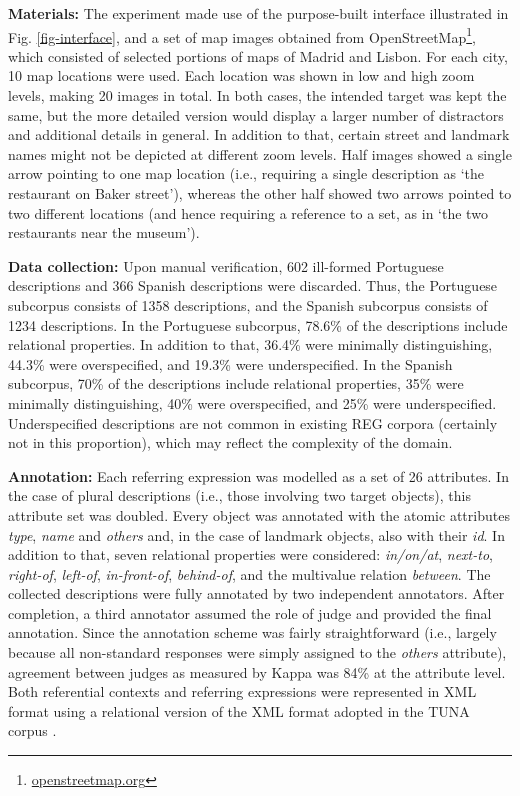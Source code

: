 \documentclass[11pt]{article}
\begin{document}
{\bf Materials:} The experiment made use of the purpose-built interface illustrated in Fig. \ref{fig-interface}, and a set of map images obtained from OpenStreetMap\footnote{\url{openstreetmap.org}}, which consisted of selected portions of maps of Madrid and Lisbon. For each city, 10 map locations were used. Each location was shown in low and high zoom levels, making 20 images in total. In both cases, the intended target was kept the same, but the more detailed version would display a larger number of distractors and additional details in general. In addition to that, certain street and landmark names might not be depicted at different zoom levels. Half images showed a single arrow pointing to one map location (i.e., requiring a single description as `the restaurant on Baker street'), whereas the other half showed two arrows pointed to two different locations (and hence requiring a reference to a set, as in `the two restaurants near the museum'). 

{\bf Data collection:} Upon manual verification, 602 ill-formed Portuguese descriptions and 366 Spanish descriptions were discarded. Thus, the Portuguese subcorpus consists of 1358 descriptions, and the Spanish subcorpus consists of 1234 descriptions. In the Portuguese subcorpus, 78.6\% of the descriptions include relational properties. In addition to that, 36.4\% were minimally distinguishing, 44.3\% were overspecified, and  19.3\% were underspecified. In the Spanish subcorpus, 70\% of the descriptions include relational properties, 35\% were minimally distinguishing, 40\% were overspecified, and 25\% were underspecified. Underspecified descriptions are not common in existing REG corpora (certainly not in this proportion), which may reflect the complexity of the domain.

{\bf Annotation:} Each referring expression was modelled as a set of 26 attributes. In the case of plural descriptions (i.e., those involving two target objects), this attribute set was doubled. Every object was annotated with the atomic attributes {\em type}, {\em name} and {\em others} and, in the case of landmark objects, also with their {\em id}. In addition to that, seven relational properties were considered: {\em in/on/at}, {\em next-to}, {\em right-of}, {\em left-of}, {\em in-front-of}, {\em behind-of}, and the multivalue relation {\em between}. The collected descriptions were fully annotated by two independent annotators. After completion, a third annotator assumed the role of judge and provided the final annotation. Since the annotation scheme was fairly straightforward (i.e., largely because all non-standard responses were simply assigned to the {\em others} attribute), agreement between judges as measured by Kappa \cite{kappa} was 84\% at the attribute level. Both referential contexts and referring expressions were represented in XML format using a relational version of the XML format adopted in the TUNA corpus \cite{tuna-corpus}. 
\end{document}
